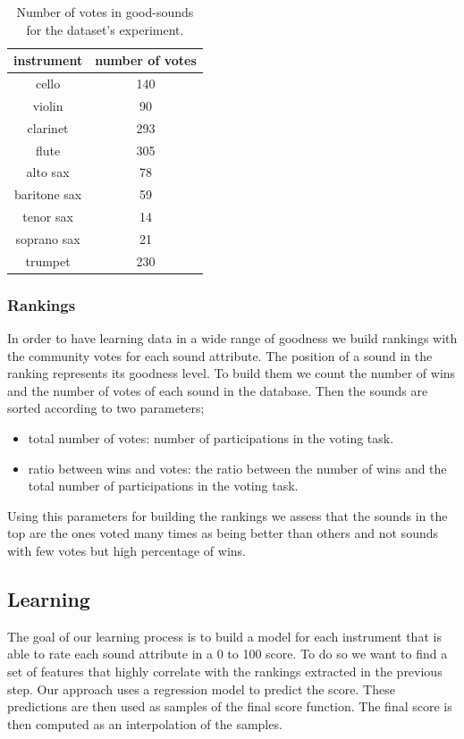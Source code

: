 \documentclass{article}
\begin{document}
\begin{table}[ht]
\centering
\begin{tabular}{cc}
\hline
instrument   & number of votes \\ \hline
cello        & 140             \\
violin       & 90              \\
clarinet     & 293             \\
flute        & 305             \\
alto sax     & 78              \\
baritone sax & 59              \\
tenor sax    & 14              \\
soprano sax  & 21              \\
trumpet      & 230             \\ \hline
\end{tabular}
\caption{Number of votes in good-sounds for the dataset's experiment.}
\label{votes}
\end{table}

\subsubsection{Rankings}
In order to have learning data in a wide range of goodness we build rankings with the community votes for each sound attribute. The position of a sound in the ranking represents its goodness level. To build them we count the number of wins and the number of votes of each sound in the database. Then the sounds are sorted according to two parameters; 

\begin{itemize}
	\item{total number of votes: number of participations in the voting task.}
	\item{ratio between wins and votes: the ratio between the number of wins and the total number of participations in the voting task.}
\end{itemize}
  
Using this parameters for building the rankings we assess that the sounds in the top are the ones voted many times as being better than others and not sounds with few votes but high percentage of wins.

\subsection{Learning}
The goal of our learning process is to build a model for each instrument that is able to rate each sound attribute in a 0 to 100 score. To do so we want to find a set of features that highly correlate with the rankings extracted in the previous step.  
Our approach uses a regression model to predict the score. These predictions are then used as samples of the final score function. The final score is then computed as an interpolation of the samples.
\end{document}
